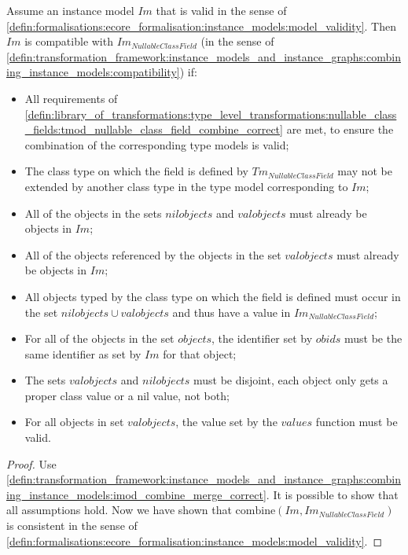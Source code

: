 \begin{thm}
\label{defin:library_of_transformations:instance_level_transformations:nullable_class_field_values:imod_nullable_class_field_combine_correct}
Assume an instance model $Im$ that is valid in the sense of \cref{defin:formalisations:ecore_formalisation:instance_models:model_validity}. Then $Im$ is compatible with $Im_{NullableClassField}$ (in the sense of \cref{defin:transformation_framework:instance_models_and_instance_graphs:combining_instance_models:compatibility}) if:
\begin{itemize}
    \item All requirements of \cref{defin:library_of_transformations:type_level_transformations:nullable_class_fields:tmod_nullable_class_field_combine_correct} are met, to ensure the combination of the corresponding type models is valid;
    \item The class type on which the field is defined by $Tm_{NullableClassField}$ may not be extended by another class type in the type model corresponding to $Im$;
    \item All of the objects in the sets $nilobjects$ and $valobjects$ must already be objects in $Im$;
    \item All of the objects referenced by the objects in the set $valobjects$ must already be objects in $Im$;
    \item All objects typed by the class type on which the field is defined must occur in the set $nilobjects \cup valobjects$ and thus have a value in $Im_{NullableClassField}$;
    \item For all of the objects in the set $objects$, the identifier set by $obids$ must be the same identifier as set by $Im$ for that object;
    \item The sets $valobjects$ and $nilobjects$ must be disjoint, each object only gets a proper class value or a nil value, not both;
    \item For all objects in set $valobjects$, the value set by the $values$ function must be valid.
\end{itemize}
\end{thm}

\begin{proof}
Use \cref{defin:transformation_framework:instance_models_and_instance_graphs:combining_instance_models:imod_combine_merge_correct}. It is possible to show that all assumptions hold. Now we have shown that $\mathrm{combine}(Im, Im_{NullableClassField})$ is consistent in the sense of \cref{defin:formalisations:ecore_formalisation:instance_models:model_validity}.
\end{proof}

